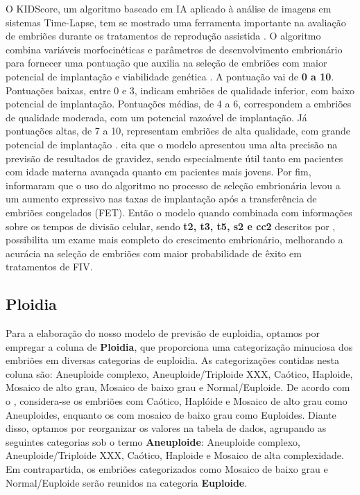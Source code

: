 O KIDScore\texttrademark{}, um algoritmo baseado em IA aplicado à análise de imagens em sistemas Time-Lapse, tem se mostrado uma ferramenta importante na avaliação de embriões durante os tratamentos de reprodução assistida \cite{kato2021}. O algoritmo combina variáveis morfocinéticas e parâmetros de desenvolvimento embrionário para fornecer uma pontuação que auxilia na seleção de embriões com maior potencial de implantação e viabilidade genética \cite{gazzo2020}. A pontuação vai de \textbf{0 a 10}. Pontuações baixas, entre 0 e 3, indicam embriões de qualidade inferior, com baixo potencial de implantação. Pontuações médias, de 4 a 6, correspondem a embriões de qualidade moderada, com um potencial razoável de implantação. Já pontuações altas, de 7 a 10, representam embriões de alta qualidade, com grande potencial de implantação \cite{gazzo2020}.  cita que o modelo apresentou uma alta precisão na previsão de resultados de gravidez, sendo especialmente útil tanto em pacientes com idade materna avançada quanto em pacientes mais jovens. Por fim,  informaram que o uso do algoritmo no processo de seleção embrionária levou a um aumento expressivo nas taxas de implantação após a transferência de embriões congelados (FET). Então o modelo quando combinada com informações sobre os tempos de divisão celular, sendo \textbf{t2, t3, t5, s2 e cc2} descritos por , possibilita um exame mais completo do crescimento embrionário, melhorando a acurácia na seleção de embriões com maior probabilidade de êxito em tratamentos de FIV.

\subsection{Ploidia}
Para a elaboração do nosso modelo de previsão de euploidia, optamos por empregar a coluna de \textbf{Ploidia}, que proporciona uma categorização minuciosa dos embriões em diversas categorias de euploidia. As categorizações contidas nesta coluna são: Aneuploide complexo, Aneuploide/Triploide XXX, Caótico, Haploide, Mosaico de alto grau, Mosaico de baixo grau e Normal/Euploide. De acordo com o , considera-se os embriões com Caótico, Haplóide e Mosaico de alto grau como Aneuploides, enquanto os com mosaico de baixo grau como Euploides. Diante disso, optamos por reorganizar os valores na tabela de dados, agrupando as seguintes categorias sob o termo \textbf{Aneuploide}: Aneuploide complexo, Aneuploide/Triploide XXX, Caótico, Haploide e Mosaico de alta complexidade. Em contrapartida, os embriões categorizados como Mosaico de baixo grau e Normal/Euploide serão reunidos na categoria \textbf{Euploide}.

